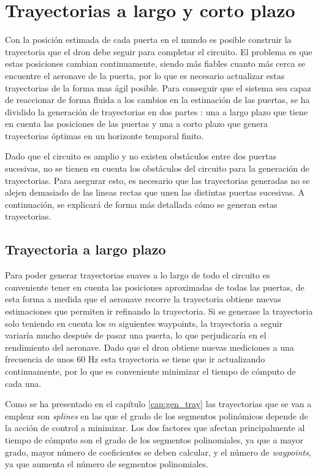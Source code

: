 \section{Trayectorias a largo y corto plazo}

Con la posición estimada de cada puerta en el mundo es posible construir la trayectoria que el dron debe seguir para completar el circuito. El problema es que estas posiciones cambian continuamente, siendo más fiables cuanto más cerca se encuentre el aeronave de la puerta, por lo que es necesario actualizar estas trayectorias de la forma mas ágil posible. Para conseguir que el sistema sea capaz de reaccionar de forma fluida a los cambios en la estimación de las puertas, se ha dividido la generación de trayectorias en dos partes : una a largo plazo que tiene en cuenta las posiciones de las puertas y una a corto plazo que genera trayectorias óptimas en un horizonte temporal finito.

Dado que el circuito es amplio y no existen obstáculos entre dos puertas sucesivas, no se tienen en cuenta los obstáculos del circuito para la generación de trayectorias. Para asegurar esto, es necesario que las trayectorias generadas no se alejen demasiado de las lineas rectas que unen las distintas puertas sucesivas. A continuación, se explicará de forma más detallada cómo se generan estas trayectorias.
\subsection{Trayectoria a largo plazo}

Para poder generar trayectorias suaves a lo largo de todo el circuito es conveniente tener en cuenta las posiciones aproximadas de todas las puertas,  de esta forma a medida que el aeronave recorre la trayectoria obtiene nuevas estimaciones que permiten ir refinando la trayectoria. Si se generase la trayectoria solo teniendo en cuenta los $m$ siguientes waypoints, la trayectoria a seguir variaría mucho después de pasar una puerta, lo que perjudicaría en el rendimiento del aeronave. Dado que el dron obtiene nuevas mediciones a una frecuencia de unos 60 Hz esta trayectoria se tiene que ir actualizando continuamente, por lo que es conveniente minimizar el tiempo de cómputo de cada una. 

Como se ha presentado en el capítulo \ref{cap:gen_tray} las trayectorias que se van a emplear son \textit{splines} en las que el grado de los segmentos polinómicos depende de la acción de control a minimizar. Los dos factores que afectan principalmente al tiempo de cómputo son el grado de los segmentos polinomiales, ya que a mayor grado, mayor número de coeficientes se deben calcular, y el número de \textit{waypoints}, ya que aumenta el número de segmentos polinomiales.


